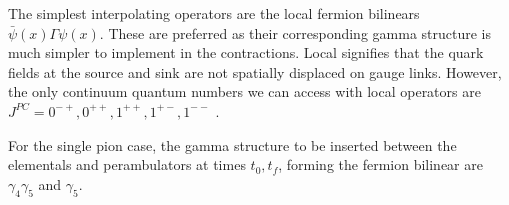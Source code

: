 The simplest interpolating operators are the local fermion bilinears $\bar{\psi}(x)\Gamma\psi(x)$. These are preferred as their corresponding gamma structure is much simpler to implement in the contractions. Local signifies that the quark fields at the source and sink are not spatially displaced on gauge links. However, the only continuum quantum numbers we can access with local operators are $J^{PC} = 0^{-+},0^{++},1^{++},1^{+-},1^{--}$ \cite{Dudek_2008}.

For the single pion case, the gamma structure to be inserted between the elementals and perambulators at times $t_0,t_f$, forming the fermion bilinear are $\gamma_4\gamma_5$ and $\gamma_5$.
